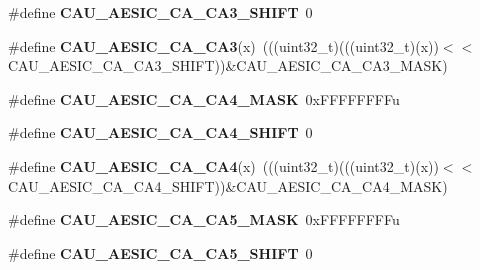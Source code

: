 \begin{DoxyCompactItemize}
\item 
\#define {\bfseries C\+A\+U\+\_\+\+A\+E\+S\+I\+C\+\_\+\+C\+A\+\_\+\+C\+A3\+\_\+\+S\+H\+I\+FT}~0\hypertarget{group__CAU__Register__Masks_gaa4221586809a5c86c3209735723f6427}{}\label{group__CAU__Register__Masks_gaa4221586809a5c86c3209735723f6427}

\item 
\#define {\bfseries C\+A\+U\+\_\+\+A\+E\+S\+I\+C\+\_\+\+C\+A\+\_\+\+C\+A3}(x)~(((uint32\+\_\+t)(((uint32\+\_\+t)(x))$<$$<$C\+A\+U\+\_\+\+A\+E\+S\+I\+C\+\_\+\+C\+A\+\_\+\+C\+A3\+\_\+\+S\+H\+I\+FT))\&C\+A\+U\+\_\+\+A\+E\+S\+I\+C\+\_\+\+C\+A\+\_\+\+C\+A3\+\_\+\+M\+A\+SK)\hypertarget{group__CAU__Register__Masks_ga5113854b12720683b6e771319b35ce8c}{}\label{group__CAU__Register__Masks_ga5113854b12720683b6e771319b35ce8c}

\item 
\#define {\bfseries C\+A\+U\+\_\+\+A\+E\+S\+I\+C\+\_\+\+C\+A\+\_\+\+C\+A4\+\_\+\+M\+A\+SK}~0x\+F\+F\+F\+F\+F\+F\+F\+Fu\hypertarget{group__CAU__Register__Masks_ga5f7f6b876abee0856218de45b4d3323e}{}\label{group__CAU__Register__Masks_ga5f7f6b876abee0856218de45b4d3323e}

\item 
\#define {\bfseries C\+A\+U\+\_\+\+A\+E\+S\+I\+C\+\_\+\+C\+A\+\_\+\+C\+A4\+\_\+\+S\+H\+I\+FT}~0\hypertarget{group__CAU__Register__Masks_gabd609af8c8366c17977c9afb71ad3ca5}{}\label{group__CAU__Register__Masks_gabd609af8c8366c17977c9afb71ad3ca5}

\item 
\#define {\bfseries C\+A\+U\+\_\+\+A\+E\+S\+I\+C\+\_\+\+C\+A\+\_\+\+C\+A4}(x)~(((uint32\+\_\+t)(((uint32\+\_\+t)(x))$<$$<$C\+A\+U\+\_\+\+A\+E\+S\+I\+C\+\_\+\+C\+A\+\_\+\+C\+A4\+\_\+\+S\+H\+I\+FT))\&C\+A\+U\+\_\+\+A\+E\+S\+I\+C\+\_\+\+C\+A\+\_\+\+C\+A4\+\_\+\+M\+A\+SK)\hypertarget{group__CAU__Register__Masks_ga79b687603e9671199241f6488b42c3f5}{}\label{group__CAU__Register__Masks_ga79b687603e9671199241f6488b42c3f5}

\item 
\#define {\bfseries C\+A\+U\+\_\+\+A\+E\+S\+I\+C\+\_\+\+C\+A\+\_\+\+C\+A5\+\_\+\+M\+A\+SK}~0x\+F\+F\+F\+F\+F\+F\+F\+Fu\hypertarget{group__CAU__Register__Masks_ga28294b997bba57c20628810c8a6a2b62}{}\label{group__CAU__Register__Masks_ga28294b997bba57c20628810c8a6a2b62}

\item 
\#define {\bfseries C\+A\+U\+\_\+\+A\+E\+S\+I\+C\+\_\+\+C\+A\+\_\+\+C\+A5\+\_\+\+S\+H\+I\+FT}~0\hypertarget{group__CAU__Register__Masks_gaf4c9726f6f0de1a13fa2b5a24034827b}{}\label{group__CAU__Register__Masks_gaf4c9726f6f0de1a13fa2b5a24034827b}


\end{DoxyCompactItemize}

